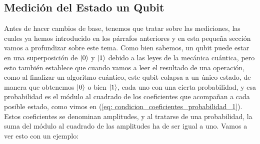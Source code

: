 \documentclass{article}
\numberwithin{equation}{section} %
\begin{document}
    \vspace{10mm}

    \subsection{Medición del Estado un Qubit}

    \vspace{5mm}

    Antes de hacer cambios de base, tenemos que tratar sobre las mediciones, las cuales ya hemos introducido en los párrafos anteriores y en esta pequeña sección vamos a profundizar sobre este tema. Como bien sabemos, un qubit puede estar en una superposición de \( \ket{0} \) y \( \ket{1} \) debido a las leyes de la mecánica cuántica, pero esto también establece que cuando vamos a leer el resultado de una operación, como al finalizar un algoritmo cuántico, este qubit colapsa a un único estado, de manera que obtenemos \( \ket{0} \) o bien \( \ket{1} \), cada uno con una cierta probabilidad, y esa probabilidad es el módulo al cuadrado de los coeficientes que acompañan a cada posible estado, como vimos en (\ref{eq: condicion_coeficientes_probabilidad_1}). Estos coeficientes se denominan amplitudes, y al tratarse de una probabilidad, la suma del módulo al cuadrado de las amplitudes ha de ser igual a uno. Vamos a ver esto con un ejemplo:

    \vspace{5mm}
\end{document}

